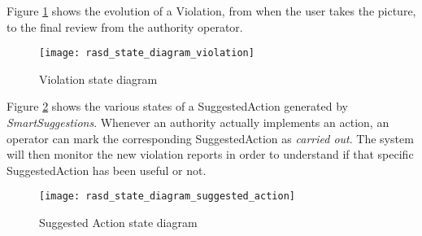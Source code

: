 Figure \ref{fig:violationDiagram} shows the evolution of a Violation, from when
the user takes the picture, to the final review from the authority operator.

\begin{figure}[H]
    \centering
    \texttt{[image: rasd\_state\_diagram\_violation]}
    \caption{Violation state diagram}
    \label{fig:violationDiagram}
\end{figure}

Figure \ref{fig:suggestedActionDiagram} shows the various states of a
SuggestedAction generated by \emph{SmartSuggestions}. Whenever an authority
actually implements an action, an operator can mark the corresponding
SuggestedAction as \emph{carried out}. The system will then monitor the new
violation reports in order to understand if that specific SuggestedAction has
been useful or not.

\begin{figure}[H]
    \centering
    \texttt{[image: rasd\_state\_diagram\_suggested\_action]}
    \caption{Suggested Action state diagram}
    \label{fig:suggestedActionDiagram}
\end{figure}